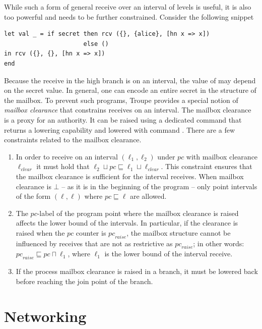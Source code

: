 While such a form of general receive over an interval of levels is useful, it is also too powerful
and needs to be further constrained. Consider the following snippet

\begin{lstlisting}
let val _ = if secret then rcv ({}, {alice}, [hn x => x])
                      else ()
in rcv ({}, {}, [hn x => x])
end
\end{lstlisting}

Because the receive in the high branch is on an interval, the value of  may
depend on the secret value. In general, one can encode an entire secret in the structure
of the mailbox. To prevent such programs, Troupe provides a special notion of \emph{mailbox clearance}
that constrains receives on an interval. The mailbox clearance is a proxy for an authority.
It can be raised using a dedicated command  that returns a lowering
capability and lowered with command .
There are a few constraints related to the mailbox clearance.

\begin{enumerate}
    \item In order to receive on an interval $(\ell_1, \ell_2)$ under $\mathit{pc}$
    with mailbox clearance $\ell_{\mathit{clear}}$ it must hold that $\ell_2 \sqcup \mathit{pc} \sqsubseteq \ell_1 \sqcup \ell_{\mathit{clear}}$.
    This constraint ensures that the mailbox clearance is sufficient for the interval receives. When mailbox clearance is $\bot$ -- as it is in the beginning of the program -- only point intervals of the form $(\ell, \ell)$ where $\mathit{pc} \sqsubseteq \ell$ are allowed.

    \item The $\mathit{pc}$-label of the program point where the mailbox clearance is raised affects the lower bound of the intervals. In particular, if the clearance is raised when the $\mathit{pc}$ counter is $\mathit{pc}_{\mathit{raise}}$, the mailbox structure cannot be influenced by receives that are not as restrictive as $\mathit{pc}_{\mathit{raise}}$; in other words: $ \mathit{pc}_\mathit{raise} \sqsubseteq \mathit{pc} \sqcap \ell_1$, where $\ell_1$ is the lower bound of the interval receive.
    \item If the process mailbox clearance is raised in a branch, it must be lowered back before reaching the join point of the branch.
\end{enumerate}


\section{Networking}
\label{sec:network}

